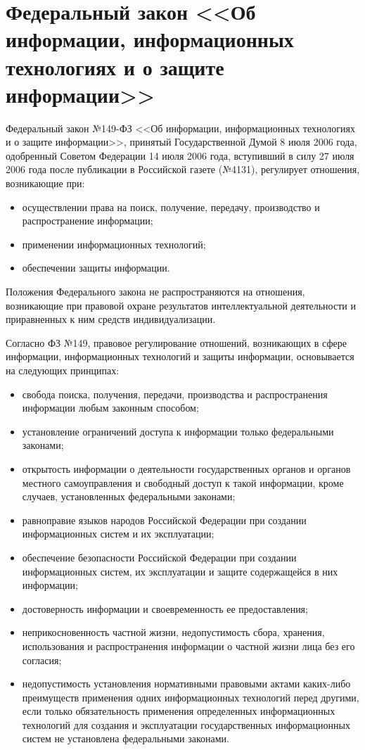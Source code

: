 \section{Федеральный закон <<Об информации, информационных технологиях и о защите информации>>} \label{rights_149}

Федеральный закон №149-ФЗ <<Об информации, информационных технологиях и о защите информации>>, принятый Государственной Думой 8 июля 2006 года, одобренный Советом Федерации 14 июля 2006 года, вступивший в силу 27 июля 2006 года после публикации в Российской газете (№4131), регулирует отношения, возникающие при:
\begin{itemize}
	\item осуществлении права на поиск, получение, передачу, производство и распространение информации;
	\item применении информационных технологий;
	\item обеспечении защиты информации.
\end{itemize}

Положения Федерального закона не распространяются на отношения, возникающие при правовой охране результатов интеллектуальной деятельности и приравненных к ним средств индивидуализации.

\vspace{\baselineskip}
Согласно ФЗ №149, правовое регулирование отношений, возникающих в сфере информации, информационных технологий и защиты информации, основывается на следующих принципах:
\begin{itemize}
	\item свобода поиска, получения, передачи, производства и распространения информации любым законным способом;
	\item установление ограничений доступа к информации только федеральными законами;
	\item открытость информации о деятельности государственных органов и органов местного самоуправления и свободный доступ к такой информации, кроме случаев, установленных федеральными законами;
	\item равноправие языков народов Российской Федерации при создании информационных систем и их эксплуатации;
	\item обеспечение безопасности Российской Федерации при создании информационных систем, их эксплуатации и защите содержащейся в них информации;
	\item достоверность информации и своевременность ее предоставления;
	\item неприкосновенность частной жизни, недопустимость сбора, хранения, использования и распространения информации о частной жизни лица без его согласия;
	\item недопустимость установления нормативными правовыми актами каких-либо преимуществ применения одних информационных технологий перед другими, если только обязательность применения определенных информационных технологий для создания и эксплуатации государственных информационных систем не установлена федеральными законами.
\end{itemize}

